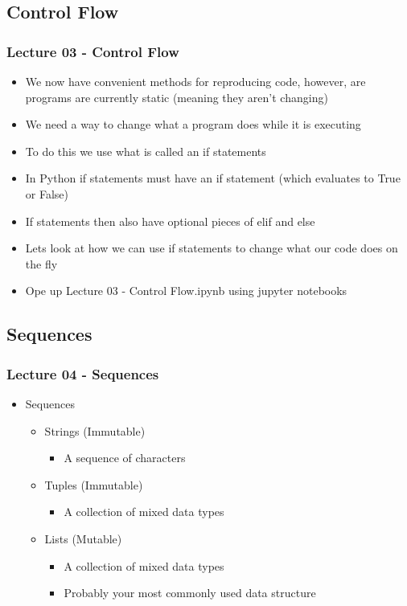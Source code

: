 \documentclass[mini frame in current subsection]{beamer}
\begin{document}
	\subsection{Control Flow}
	
		\begin{frame}
			\frametitle{Lecture 03 - Control Flow}
			\begin{itemize}
				\vfill\item  We now have convenient methods for reproducing code, however, are programs are currently static (meaning they aren't changing)
				\vfill\item  We need a way to change what a program does while it is executing
				\vfill\item  To do this we use what is called an if statements
				\vfill\item  In Python if statements must have an if statement (which evaluates to True or False)
				\vfill\item  If statements then also have optional pieces of elif and else
				\vfill\item  Lets look at how we can use if statements to change what our code does on the fly
				\vfill\item  Ope up Lecture 03 - Control Flow.ipynb using jupyter notebooks
			\end{itemize}
		\end{frame}
		
	\subsection{Sequences}
	
		\begin{frame}
			\frametitle{Lecture 04 - Sequences}
			\begin{itemize}
				\vfill\item  Sequences
					\begin{itemize}
						\item  Strings (Immutable)
							\begin{itemize}
								\item  A sequence of characters
							\end{itemize}
						\item  Tuples (Immutable)
							\begin{itemize}
								\item  A collection of mixed data types
							\end{itemize}
						\item  Lists (Mutable)
							\begin{itemize}
								\item A collection of mixed data types
								\item  Probably your most commonly used data structure
							\end{itemize}
					\end{itemize}
			\end{itemize}
		\end{frame}
		
\end{document}
